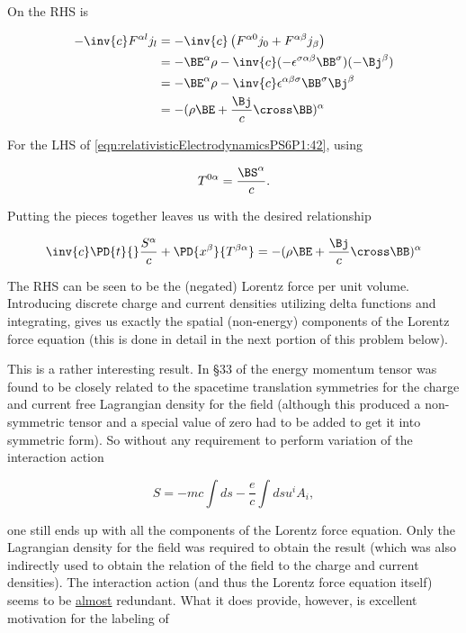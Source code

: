 On the RHS is 

\begin{align*}
-\inv{c} F^{\alpha l} j_l
&=
-\inv{c} 
\left( 
F^{\alpha 0} j_0 
+F^{\alpha \beta} j_\beta 
\right) \\
&= 
- \BE^\alpha \rho - \inv{c} (- \epsilon^{\sigma \alpha \beta} \BB^\sigma) (-\Bj^\beta) \\
&= 
- \BE^\alpha \rho - \inv{c} \epsilon^{\alpha \beta \sigma} \BB^\sigma \Bj^\beta \\
&= 
- (\rho \BE + \frac{\Bj}{c} \cross \BB)^\alpha
\end{align*}

For the LHS of \ref{eqn:relativisticElectrodynamicsPS6P1:42}, using

\begin{equation}\label{eqn:relativisticElectrodynamicsPS6P1:200}
T^{0 \alpha} = \frac{\BS^\alpha}{c}.
\end{equation}

Putting the pieces together leaves us with the desired relationship

\begin{equation}\label{eqn:relativisticElectrodynamicsPS6P1:201}
\inv{c} \PD{t}{} \frac{S^\alpha}{c} + \PD{x^\beta}{T^{\beta \alpha}} = 
- (\rho \BE + \frac{\Bj}{c} \cross \BB)^\alpha
\end{equation}

The RHS can be seen to be the (negated) Lorentz force per unit volume.  Introducing discrete charge and current densities utilizing delta functions and integrating, gives us exactly the spatial (non-energy) components of the Lorentz force equation (this is done in detail in the next portion of this problem below).

This is a rather interesting result.  In \S 33 of \cite{landau1980classical} the energy momentum tensor was found to be closely related to the spacetime translation symmetries for the charge and current free Lagrangian density for the field (although this produced a non-symmetric tensor and a special value of zero had to be added to get it into symmetric form).  So without any requirement to perform variation of the interaction action

\begin{equation}\label{eqn:relativisticElectrodynamicsPS6P1:202}
S = -m c \int ds - \frac{e}{c} \int ds u^i A_i,
\end{equation}

one still ends up with all the components of the Lorentz force equation.  Only the Lagrangian density for the field was required to obtain the result (which was also indirectly used to obtain the relation of the field to the charge and current densities).  The interaction action (and thus the Lorentz force equation itself) seems to be \underline{almost} redundant.  What it does provide, however, is excellent motivation for the labeling of

